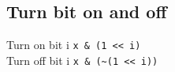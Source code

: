 \subsection{Turn bit on and off}
Turn on bit i \lstinline{x & (1 << i)}\\
Turn off bit i \lstinline{x & (~(1 << i))}\\
